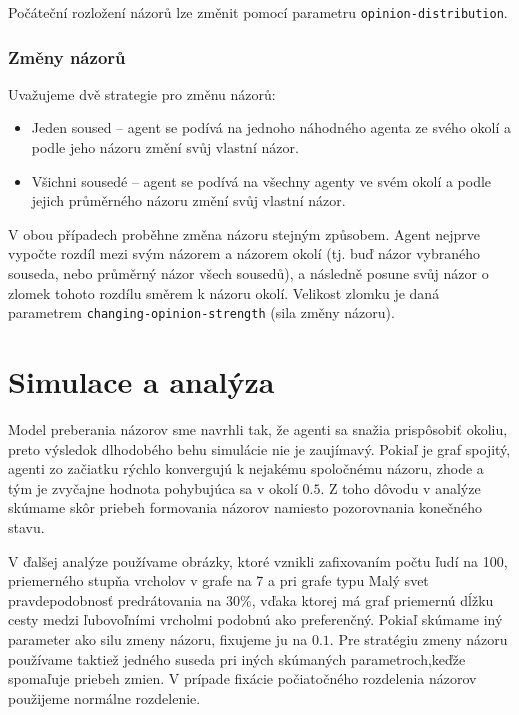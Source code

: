 \documentclass[10pt,a4paper]{report}
\begin{document}
Počáteční rozložení názorů lze změnit pomocí parametru \texttt{opinion-distribution}. 

\subsection{Změny názorů}
Uvažujeme dvě strategie pro změnu názorů:

\begin{itemize}
	\item Jeden soused -- agent se podívá na jednoho náhodného agenta ze svého okolí a podle jeho názoru změní svůj vlastní názor.
	\item Všichni sousedé -- agent se podívá na všechny agenty ve svém okolí a podle jejich průměrného názoru změní svůj vlastní názor.
\end{itemize}

V obou případech proběhne změna názoru stejným způsobem. Agent nejprve vypočte rozdíl mezi svým názorem a názorem okolí (tj. buď názor vybraného souseda, nebo průměrný názor všech sousedů), a následně posune svůj názor o zlomek tohoto rozdílu směrem k názoru okolí. Velikost zlomku je daná parametrem \texttt{changing-opinion-strength} (sila změny názoru).












\chapter{Simulace a analýza}
Model preberania názorov sme navrhli tak, že agenti sa snažia prispôsobiť okoliu, preto výsledok dlhodobého behu simulácie nie je zaujímavý. Pokiaľ je graf spojitý, agenti zo začiatku rýchlo konvergujú k nejakému spoločnému názoru, zhode a tým je zvyčajne hodnota pohybujúca sa v okolí $0.5$. Z toho dôvodu v analýze skúmame skôr priebeh formovania názorov namiesto pozorovnania konečného stavu. 

V ďalšej analýze používame obrázky, ktoré vznikli zafixovaním počtu ľudí na 100, priemerného stupňa vrcholov v grafe na 7 a pri grafe typu Malý svet pravdepodobnosť predrátovania na 30\%, vďaka ktorej má graf priemernú dĺžku cesty medzi ľubovoľními vrcholmi podobnú ako preferenčný. Pokiaľ skúmame iný parameter ako silu zmeny názoru, fixujeme ju na $0.1$. Pre stratégiu zmeny názoru používame taktiež jedného suseda pri iných skúmaných parametroch,keďže spomaľuje priebeh zmien. V prípade fixácie počiatočného rozdelenia názorov použijeme normálne rozdelenie.
\end{document}

